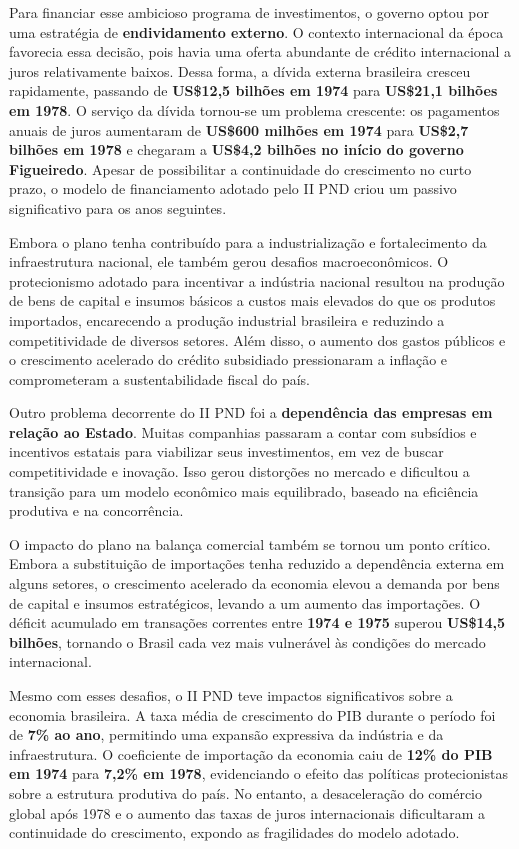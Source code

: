 \documentclass[a4paper,12pt]{article}[abntex2]
\begin{document}
Para financiar esse ambicioso programa de investimentos, o governo optou por uma estratégia de \textbf{endividamento externo}. O contexto internacional da época favorecia essa decisão, pois havia uma oferta abundante de crédito internacional a juros relativamente baixos. Dessa forma, a dívida externa brasileira cresceu rapidamente, passando de \textbf{US\$12,5 bilhões em 1974} para \textbf{US\$21,1 bilhões em 1978}. O serviço da dívida tornou-se um problema crescente: os pagamentos anuais de juros aumentaram de \textbf{US\$600 milhões em 1974} para \textbf{US\$2,7 bilhões em 1978} e chegaram a \textbf{US\$4,2 bilhões no início do governo Figueiredo}. Apesar de possibilitar a continuidade do crescimento no curto prazo, o modelo de financiamento adotado pelo II PND criou um passivo significativo para os anos seguintes.

Embora o plano tenha contribuído para a industrialização e fortalecimento da infraestrutura nacional, ele também gerou desafios macroeconômicos. O protecionismo adotado para incentivar a indústria nacional resultou na produção de bens de capital e insumos básicos a custos mais elevados do que os produtos importados, encarecendo a produção industrial brasileira e reduzindo a competitividade de diversos setores. Além disso, o aumento dos gastos públicos e o crescimento acelerado do crédito subsidiado pressionaram a inflação e comprometeram a sustentabilidade fiscal do país.

Outro problema decorrente do II PND foi a \textbf{dependência das empresas em relação ao Estado}. Muitas companhias passaram a contar com subsídios e incentivos estatais para viabilizar seus investimentos, em vez de buscar competitividade e inovação. Isso gerou distorções no mercado e dificultou a transição para um modelo econômico mais equilibrado, baseado na eficiência produtiva e na concorrência.

O impacto do plano na balança comercial também se tornou um ponto crítico. Embora a substituição de importações tenha reduzido a dependência externa em alguns setores, o crescimento acelerado da economia elevou a demanda por bens de capital e insumos estratégicos, levando a um aumento das importações. O déficit acumulado em transações correntes entre \textbf{1974 e 1975} superou \textbf{US\$14,5 bilhões}, tornando o Brasil cada vez mais vulnerável às condições do mercado internacional.

Mesmo com esses desafios, o II PND teve impactos significativos sobre a economia brasileira. A taxa média de crescimento do PIB durante o período foi de \textbf{7\% ao ano}, permitindo uma expansão expressiva da indústria e da infraestrutura. O coeficiente de importação da economia caiu de \textbf{12\% do PIB em 1974} para \textbf{7,2\% em 1978}, evidenciando o efeito das políticas protecionistas sobre a estrutura produtiva do país. No entanto, a desaceleração do comércio global após 1978 e o aumento das taxas de juros internacionais dificultaram a continuidade do crescimento, expondo as fragilidades do modelo adotado.
\end{document}
